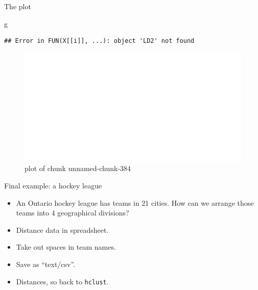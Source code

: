 \documentclass[ignorenonframetext,]{beamer}
\newenvironment{Shaded}{\begin{snugshade}}{\end{snugshade}}
\newcommand{\NormalTok}[1]{#1}
\begin{document}
\begin{frame}[fragile]{The plot}
\protect\hypertarget{the-plot-8}{}

\begin{Shaded}
\begin{Highlighting}[]
\NormalTok{g}
\end{Highlighting}
\end{Shaded}

\begin{verbatim}
## Error in FUN(X[[i]], ...): object 'LD2' not found
\end{verbatim}

\begin{figure}
\centering
\includegraphics{figure/unnamed-chunk-384-1.pdf}
\caption{plot of chunk unnamed-chunk-384}
\end{figure}

\end{frame}

\begin{frame}[fragile]{Final example: a hockey league}
\protect\hypertarget{final-example-a-hockey-league}{}

\begin{itemize}
\item
  An Ontario hockey league has teams in 21 cities. How can we arrange
  those teams into 4 geographical divisions?
\item
  Distance data in spreadsheet.
\item
  Take out spaces in team names.
\item
  Save as ``text/csv''.
\item
  Distances, so back to \texttt{hclust}.
\end{itemize}

\end{frame}
\end{document}
